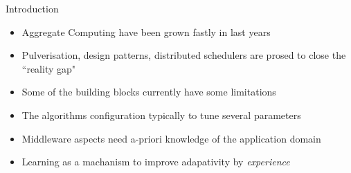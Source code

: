 \begin{frame}{ \playfairblack Introduction }
  \begin{card}
    \begin{itemize}
      \item[\success{\faThumbsUp}] Aggregate Computing have been grown fastly in last years
      \item[\success{\faThumbsUp}] Pulverisation, design patterns, distributed schedulers are prosed to close the ``reality gap"
      \item[\failure{\faThumbsDown}] Some of the building blocks currently have some limitations
      \item[\failure{\faThumbsDown}] The algorithms configuration typically to tune several parameters
      \item[\failure{\faThumbsDown}] Middleware aspects need a-priori knowledge of the application domain
      \item[\highlightAlt{\faLightbulb}] Learning as a machanism to improve adapativity by \emph{experience}
    \end{itemize}
  \end{card}
\end{frame}